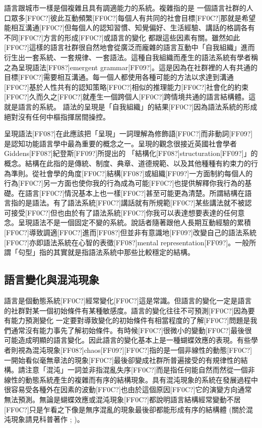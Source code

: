 語言跟城市一樣是個複雜且具有調適能力的系統。複雜指的是 一個語言社群的人口眾多[FF0C?]彼此互動頻繁[FF0C?]每個人有共同的社會目標[FF0C?]那就是希望能相互溝通[FF0C?]但每個人的認知習慣、知覺偏好、生活經驗、講話的格調各有不同[FF0C?]方言的形成[FF0C?]或語言的變化 都跟這些因素有關。雖然如此[FF0C?]這樣的語言社群很自然地會從廣泛而龐雜的語言互動中「自我組織」進而衍生出一套系統、一套規律、一套語法。這種自我組織而產生的語法系統有學者稱之為呈現語法[FF08?]emergent grammar[FF09?]。這是因為在社群裡的人有共通的目標[FF0C?]需要相互溝通。每一個人都使用各種可能的方法以求達到溝通[FF0C?]基於人性共有的認知策略[FF0C?]相似的推理能力[FF0C?]社會化的約束[FF0C?]久而久之[FF0C?]就產生一個跨個人[FF0C?]跨情境共通的語言結構體。這就是語言的系統。 語法的呈現是「自我組織」的結果[FF0C?]因為語法系統的形成絕對沒有任何中樞指揮居間操控。

呈現語法[FF08?]在此應該把「呈現」一詞理解為修飾語[FF0C?]而非動詞[FF09?]是認知功能語言學中最為重要的概念之一。呈現的觀念很接近英國社會學者 Giddens[FF08?]紀登斯[FF09?]所提出的 「結構化[FF08?]structuration[FF09?]」的概念。結構在此指的是傳統、制度、典章、道德規範、以及其他種種有約束力的行為準則。從社會學的角度[FF0C?]結構[FF08?]或組織[FF09?]一方面制約每個人的行為[FF0C?]另一方面也使你我的行為成為可能[FF0C?]也提供解釋你我行為的基礎。在語言[FF0C?]情況基本上也一樣[FF0C?]甚至可能更為清楚。所謂結構在語言指的是語法。有了語法系統[FF0C?]講話就有所規範[FF0C?]某些講法就不被認可接受[FF0C?]但也由於有了語法系統[FF0C?]你我可以表達想要表達的任何意念。呈現語法不是一個固定不變的系統。說話者隨著跟他人長期互動經驗的累積[FF0C?]導致調適[FF0C?]進而[FF08?]但並非有意識地[FF09?]改變自己的語法系統[FF0C?]亦即語法系統在心智的表徵[FF08?]mental representation[FF09?]。一般所謂「句型」指的其實就是指語法系統中那些比較穩定的結構。

\subsection{語言變化與混沌現象} %

語言是個動態系統[FF0C?]經常變化[FF0C?]這是常識。但語言的變化一定是語言的社群對某一個初始條件有某種敏感度。語言的變化往往不可預測[FF0C?]因為要有能力預測變化 一定要對導致變化的初始條件有相當程度的了解[FF0C?]問題是我們通常沒有能力事先了解初始條件。有時候[FF0C?]很微小的變動[FF0C?]最後很可能造成明顯的語言變化。因此語言的變化基本上是一種蝴蝶效應的表現。有些學者則視為混沌現象[FF08?]chaos[FF09?][FF0C?]指的是一個非線性的動態[FF0C?]一開始看似毫無章法的現象[FF0C?]最後卻變成社群所普遍接受的有規律性的結構。請注意「混沌」一詞並非指混亂失序[FF0C?]而是指任何能自然而然從一個非線性的動態系統產生的複雜而有序的結構現象。具有混沌現象的系統在發展過程中很容易受各種外在因素的波動[FF0C?]也由於這個原因[FF0C?]它的演變方向通常無法預測。無論是蝴蝶效應或混沌現象[FF0C?]都說明語言結構經常變動不居[FF0C?]只是乍看之下像是無序混亂的現象最後卻都能形成有序的結構體 (關於混沌現象請見科普著作\citealt{Gleick1988} ; \citealt{Waldrop1992})。

